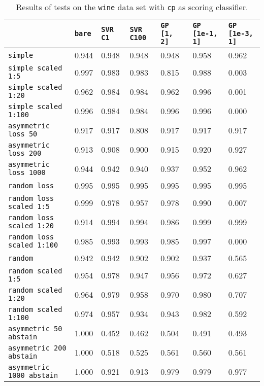 \begin{table}[H]
{\scriptsize
\begin{tabu}{l|l|l|l|l|l|l}
&\texttt{bare} &\texttt{SVR C1} &\texttt{SVR C100} &\texttt{GP [1, 2]} &\texttt{GP [1e-1, 1]} &\texttt{GP [1e-3, 1]}  \\
\hline
\texttt{simple} &0.944 &0.948 &0.948 &0.948 &0.958 &0.962 \\
\texttt{simple scaled 1:5} &0.997 &0.983 &0.983 &0.815 &0.988 &0.003 \\
\texttt{simple scaled 1:20} &0.962 &0.984 &0.984 &0.962 &0.996 &0.001 \\
\texttt{simple scaled 1:100} &0.996 &0.984 &0.984 &0.996 &0.996 &0.000 \\
\texttt{asymmetric loss 50} &0.917 &0.917 &0.808 &0.917 &0.917 &0.917 \\
\texttt{asymmetric loss 200} &0.913 &0.908 &0.900 &0.915 &0.920 &0.927 \\
\texttt{asymmetric loss 1000} &0.944 &0.942 &0.940 &0.937 &0.952 &0.962 \\
\texttt{random loss} &0.995 &0.995 &0.995 &0.995 &0.995 &0.995 \\
\texttt{random loss scaled 1:5} &0.999 &0.978 &0.957 &0.978 &0.990 &0.007 \\
\texttt{random loss scaled 1:20} &0.914 &0.994 &0.994 &0.986 &0.999 &0.999 \\
\texttt{random loss scaled 1:100} &0.985 &0.993 &0.993 &0.985 &0.997 &0.000 \\
\texttt{random} &0.942 &0.942 &0.902 &0.902 &0.937 &0.565 \\
\texttt{random scaled 1:5} &0.954 &0.978 &0.947 &0.956 &0.972 &0.627 \\
\texttt{random scaled 1:20} &0.964 &0.979 &0.958 &0.970 &0.980 &0.707 \\
\texttt{random scaled 1:100} &0.974 &0.957 &0.934 &0.943 &0.982 &0.592 \\
\texttt{asymmetric 50 abstain} &1.000 &0.452 &0.462 &0.504 &0.491 &0.493 \\
\texttt{asymmetric 200 abstain} &1.000 &0.518 &0.525 &0.561 &0.560 &0.561 \\
\texttt{asymmetric 1000 abstain} &1.000 &0.921 &0.913 &0.979 &0.979 &0.977 \\
\end{tabu} }
\caption{Results of tests on the \texttt{wine} data set
         with \texttt{cp} as scoring classifier.}
\end{table}

